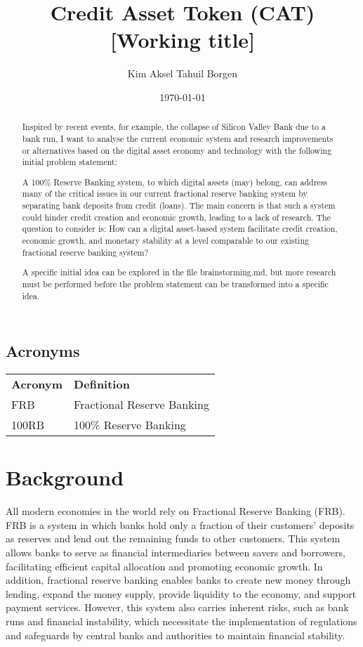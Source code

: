 \documentclass{article}
\title{Credit Asset Token (CAT) [Working title]}
\author{Kim Aksel Tahuil Borgen}
\date{\today}
\begin{document}
\maketitle
\begin{abstract}
    Inspired by recent events, for example, the collapse of Silicon Valley Bank due to a bank run, I want to analyse the current economic system and research improvements or alternatives based on the digital asset economy and technology with the following initial problem statement:

    A 100\% Reserve Banking system, to which digital assets (may) belong, can address many of the critical issues in our current fractional reserve banking system by separating bank deposits from credit (loans). The main concern is that such a system could hinder credit creation and economic growth, leading to a lack of research. The question to consider is: How can a digital asset-based system facilitate credit creation, economic growth, and monetary stability at a level comparable to our existing fractional reserve banking system? 
    
    A specific initial idea can be explored in the file brainstorming.md, but more research must be performed before the problem statement can be transformed into a specific idea. 
\end{abstract}

\subsection{Acronyms}

\begin{tabular}{ll}
\textbf{Acronym} & \textbf{Definition} \\
FRB & Fractional Reserve Banking \\
100RB & 100\% Reserve Banking \\
\end{tabular}

\section{Background}
All modern economies in the world rely on Fractional Reserve Banking (FRB). FRB is a system in which banks hold only a fraction of their customers' deposits as reserves and lend out the remaining funds to other customers. This system allows banks to serve as financial intermediaries between savers and borrowers, facilitating efficient capital allocation and promoting economic growth. In addition, fractional reserve banking enables banks to create new money through lending, expand the money supply, provide liquidity to the economy, and support payment services. However, this system also carries inherent risks, such as bank runs and financial instability, which necessitate the implementation of regulations and safeguards by central banks and authorities to maintain financial stability. 
\end{document}
